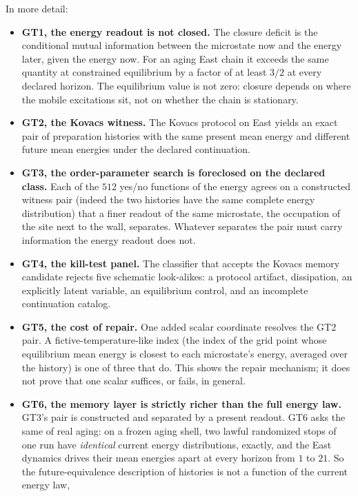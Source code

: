 In more detail:

\begin{itemize}
  \item \textbf{GT1, the energy readout is not closed.} The closure deficit is the conditional
    mutual information between the microstate now and the energy later, given the energy now.
    For an aging East chain it exceeds the same quantity at constrained equilibrium by a factor of
    at least $3/2$ at every declared horizon. The equilibrium value is not zero: closure depends
    on where the mobile excitations sit, not on whether the chain is stationary.
  \item \textbf{GT2, the Kovacs witness.} The Kovacs protocol on East yields an exact pair of
    preparation histories with the same present mean energy and different future mean energies
    under the declared continuation.
  \item \textbf{GT3, the order-parameter search is foreclosed on the declared class.} Each of the
    $512$ yes/no functions of the energy agrees on a constructed witness pair (indeed the two
    histories have the same complete energy distribution) that a finer readout of the same
    microstate, the occupation of the site next to the wall, separates. Whatever separates the
    pair must carry information the energy readout does not.
  \item \textbf{GT4, the kill-test panel.} The classifier that accepts the Kovacs memory
    candidate rejects five schematic look-alikes: a protocol artifact, dissipation, an
    explicitly latent variable, an equilibrium control, and an incomplete continuation catalog.
  \item \textbf{GT5, the cost of repair.} One added scalar coordinate resolves the GT2 pair. A
    fictive-temperature-like index (the index of the grid point whose equilibrium mean energy is
    closest to each microstate's energy, averaged over the history) is one of three that do. This
    shows the repair mechanism; it does not prove that one scalar suffices, or fails, in general.
  \item \textbf{GT6, the memory layer is strictly richer than the full energy law.} GT3's pair
    is constructed and separated by a present readout. GT6 asks the same of real aging: on a
    frozen aging shell, two lawful randomized stops of one run have \emph{identical} current
    energy distributions, exactly, and the East dynamics drives their mean energies apart at every
    horizon from $1$ to $21$. So the
    future-equivalence description of histories is not a function of the current energy law,

\end{itemize}
